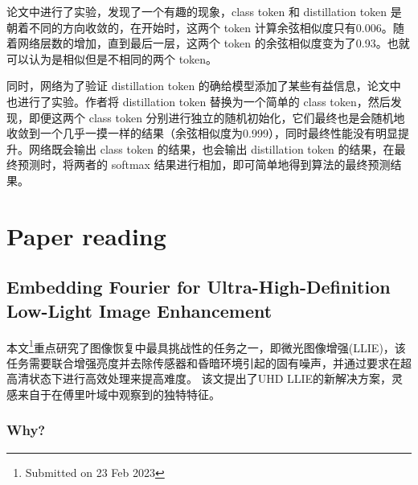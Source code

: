 \documentclass[letterpaper,10pt]{article}
\begin{document}
	论文中进行了实验，发现了一个有趣的现象，class token 和 distillation token 是朝着不同的方向收敛的，在开始时，这两个 token 计算余弦相似度只有0.006。随着网络层数的增加，直到最后一层，这两个 token 的余弦相似度变为了0.93。也就可以认为是相似但是不相同的两个 token。
	
	同时，网络为了验证 distillation token 的确给模型添加了某些有益信息，论文中也进行了实验。作者将 distillation token 替换为一个简单的 class token，然后发现，即便这两个 class token 分别进行独立的随机初始化，它们最终也是会随机地收敛到一个几乎一摸一样的结果（余弦相似度为0.999），同时最终性能没有明显提升。网络既会输出 class token 的结果，也会输出 distillation token 的结果，在最终预测时，将两者的 softmax 结果进行相加，即可简单地得到算法的最终预测结果。
	

	
	\section{Paper reading}
	
	\subsection{Embedding Fourier for Ultra-High-Definition Low-Light Image Enhancement \cite{li2023embedding}}
	
	本文\footnote{Submitted on 23 Feb 2023}重点研究了图像恢复中最具挑战性的任务之一，即微光图像增强(LLIE)，该任务需要联合增强亮度并去除传感器和昏暗环境引起的固有噪声，并通过要求在超高清状态下进行高效处理来提高难度。
	该文提出了UHD LLIE的新解决方案，灵感来自于在傅里叶域中观察到的独特特征。
	
	\subsubsection{Why?}
	
\end{document}
